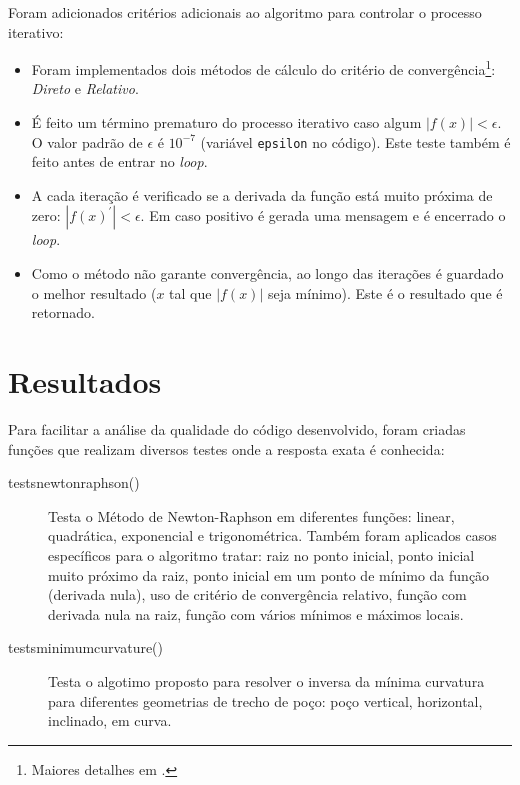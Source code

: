 \documentclass[final,5p]{elsarticle}
\numberwithin{equation}{section}
\begin{document}
    Foram adicionados critérios adicionais ao algoritmo para controlar o processo iterativo:

    \begin{itemize}
        \item Foram implementados dois métodos de cálculo do critério de convergência\footnote{Maiores detalhes em \cite{relatoriobisseccao}.}: \emph{Direto} e \emph{Relativo}.
        \item É feito um término prematuro do processo iterativo caso algum $|f(x)| < \epsilon$. O valor padrão de $\epsilon$ é $10^{-7}$ (variável \verb|epsilon| no código). Este teste também é feito antes de entrar no \emph{loop}.
        \item A cada iteração é verificado se a derivada da função está muito próxima de zero: $|f(x)^{\prime}| < \epsilon$. Em caso positivo é gerada uma mensagem e é encerrado o \emph{loop}.
        \item Como o método não garante convergência, ao longo das iterações é guardado o melhor resultado ($x$ tal que $|f(x)|$ seja mínimo). Este é o resultado que é retornado.
    \end{itemize}
    
    \section{Resultados}
    
    Para facilitar a análise da qualidade do código desenvolvido, foram criadas funções que realizam diversos testes onde a resposta exata é conhecida:

    \begin{description}
        \item[tests\textunderscore newton\textunderscore raphson()] Testa o Método de Newton-Raphson em diferentes funções: linear, quadrática, exponencial e trigonométrica. Também foram aplicados casos específicos para o algoritmo tratar: raiz no ponto inicial, ponto inicial muito próximo da raiz, ponto inicial em um ponto de mínimo da função (derivada nula), uso de critério de convergência relativo, função com derivada nula na raiz, função com vários mínimos e máximos locais.
        
        \item[tests\textunderscore minimum\textunderscore curvature()] Testa o algotimo proposto para resolver o inversa da mínima curvatura para diferentes geometrias de trecho de poço: poço vertical, horizontal, inclinado, em curva.
    \end{description}
\end{document}
